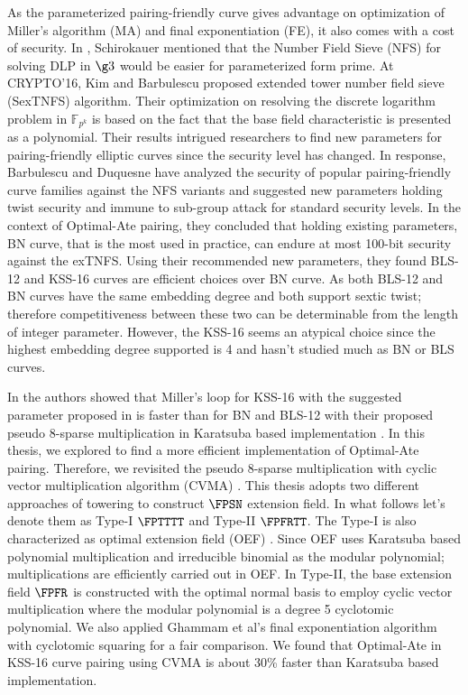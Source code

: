 As the parameterized pairing-friendly curve gives advantage on optimization of Miller's algorithm (MA) and final exponentiation (FE), it also comes with a cost of security. 
In \cite{DBLP:journals/moc/Schirokauer10}, Schirokauer mentioned that the Number Field Sieve (NFS) for solving DLP in $\g3$ would be easier for parameterized form prime. 
At CRYPTO'16, Kim and Barbulescu proposed extended tower number field sieve (SexTNFS) algorithm\cite{C:KimBar16}.
Their optimization on resolving the discrete logarithm problem in $\mathbb{F}_{p^k}$ is based on the fact that the base field characteristic is presented as a polynomial.
Their results intrigued researchers to find new parameters for pairing-friendly elliptic curves since the security level has changed.
In response, Barbulescu and Duquesne have analyzed the security of popular pairing-friendly curve families against the NFS variants and suggested new parameters \cite{sylvain_new_param} holding twist security and immune to sub-group attack for standard security levels. 
In the context of Optimal-Ate pairing, they concluded that holding existing parameters, BN curve, that is the most used in practice, can endure at most 100-bit security against the exTNFS.  
Using their recommended new parameters, they found BLS-12 and KSS-16 curves are efficient choices over BN curve.
As both BLS-12 and BN curves have the same embedding degree and both support sextic twist; therefore competitiveness between these two can be determinable from the length of integer parameter.
However, the KSS-16 seems an atypical choice since the highest embedding degree supported is 4 and hasn't studied much as BN or BLS curves.

In \cite{INDOCRYPT:KNGDNK17} the authors showed that Miller's loop for KSS-16 with the suggested parameter proposed in \cite{sylvain_new_param} is faster than for BN and BLS-12 with their proposed pseudo 8-sparse multiplication in Karatsuba based implementation \cite{INDOCRYPT:KNGDNK17}.
In this thesis, we explored to find a more efficient implementation of Optimal-Ate pairing. 
Therefore, we revisited the pseudo 8-sparse multiplication with cyclic vector multiplication algorithm (CVMA) \cite{cvma_kato}.
This thesis adopts two different approaches of towering to construct $\FPSN$ extension field. 
In what follows let's denote them as Type-I $\FPTTTT$ and Type-II  $\FPFRTT$.
The Type-I is also characterized as optimal extension field (OEF) \cite{JC:BaiPaa01}.
Since OEF uses Karatsuba based polynomial multiplication and irreducible binomial as the modular polynomial;  multiplications are efficiently carried out in OEF. 
In Type-II,  the base extension field $\FPFR$ is constructed with the optimal normal basis to employ cyclic vector multiplication where the modular polynomial is a degree 5 cyclotomic polynomial.
We also applied Ghammam et al's \cite{EPRINT:GhaFou16b} final exponentiation algorithm with cyclotomic squaring \cite{DBLP:journals/moc/Karabina13} for a fair comparison.
We found that Optimal-Ate in KSS-16 curve pairing using CVMA is about 30\% faster than Karatsuba based implementation.

